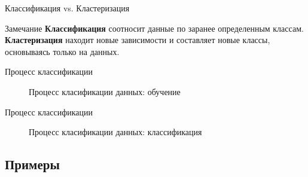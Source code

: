 \documentclass{beamer}
\begin{document}
\begin{frame}{Классификация vs. Кластеризация}
  \begin{block}{Замечание}
    \textbf{Классификация} соотносит данные по заранее определенным классам. \textbf{Кластеризация} находит новые зависимости и составляет новые классы, основываясь только на данных.
  \end{block}
\end{frame}

\begin{frame}{Процесс классификации}
  \begin{figure}
    \caption{Процесс класификации данных: обучение}
  \end{figure}
\end{frame}

\begin{frame}{Процесс классификации}
  \begin{figure}
    \caption{Процесс класификации данных: классификация}
  \end{figure}
\end{frame}

\subsection{Примеры}
\end{document}
